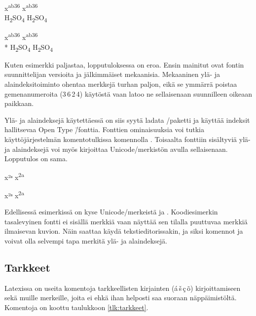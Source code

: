 \begin{koodilohkosis}
  x\textsuperscript {ab36}
  x\textsuperscript*{ab36} \\
  H\textsubscript {2}SO\textsubscript {4}
  H\textsubscript*{2}SO\textsubscript*{4}
\end{koodilohkosis}

\begin{tulossis}
  x\textsuperscript {ab36}
  x\textsuperscript*{ab36} \\*
  H\textsubscript {2}SO\textsubscript {4}
  H\textsubscript*{2}SO\textsubscript*{4}
\end{tulossis}

Kuten esimerkki paljastaa, lopputuloksessa on eroa. Ensin mainitut ovat
fontin suunnittelijan versioita ja jälkimmäiset mekaanisia. Mekaaninen
ylä- ja ala\-in\-dek\-si\-toi\-min\-to ohentaa merkkejä turhan paljon,
eikä se ymmärrä poistaa gemenanumeroita (3\,6\,2\,4) käytöstä vaan latoo
ne sellaisenaan suunnilleen oikeaan paikkaan.

Ylä- ja alaindeksejä käytettäessä on siis syytä ladata
\-/paketti ja käyttää indeksit hallitsevaa Open
Type \=/fonttia. Fonttien ominaisuuksia voi tutkia käyttöjärjestelmän
komentotulkissa komennolla . Toisaalta fonttiin
sisältyviä ylä- ja alaindeksejä voi myös kirjoittaa Unicode\-/merkistön
avulla sellaisenaan. Lopputulos on sama.

\begin{koodilohkosis}
  x²ᵃ x\textsuperscript{2a}
\end{koodilohkosis}

\begin{tulossis}
  x²ᵃ x\textsuperscript{2a}
\end{tulossis}

Edellisessä esimerkissä on kyse Unicode\-/merkeistä  ja .
Koo\-di\-esi\-mer\-kin tasalevyinen fontti ei sisällä merkkiä
 vaan näyttää sen tilalla puuttuvaa merkkiä ilmaisevan
kuvion. Näin saattaa käydä tekstieditorissakin, ja siksi komennot
 ja  voivat olla
selvempi tapa merkitä ylä- ja alaindeksejä.

\subsection{Tarkkeet}

Latexissa on useita komentoja tarkkeellisten kirjainten
(\'a\,\v{s}\,\c{c}\,\~o) kirjoittamiseen sekä muille merkeille, joita ei
ehkä ihan helposti saa suoraan näppäimistöltä. Komentoja on koottu
taulukkoon \ref{tlk:tarkkeet}.

